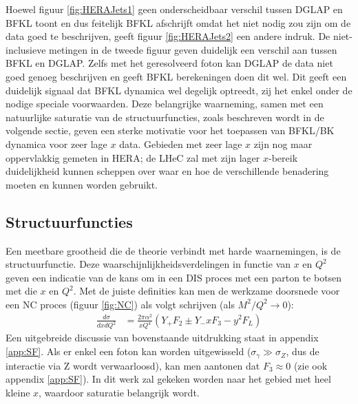 \documentclass[a4paper,11pt]{article}
\numberwithin{equation}{section} %
\begin{document}
Hoewel figuur \ref{fig:HERAJets1} geen onderscheidbaar verschil tussen DGLAP en BFKL toont en dus feitelijk BFKL afschrijft omdat het niet nodig zou zijn om de data goed te beschrijven, geeft figuur \ref{fig:HERAJets2} een andere indruk.
De niet-inclusieve metingen in de tweede figuur geven duidelijk een verschil aan tussen BFKL en DGLAP.
Zelfs met het geresolveerd foton kan DGLAP de data niet goed genoeg beschrijven en geeft BFKL berekeningen doen dit wel.
Dit geeft een duidelijk signaal dat BFKL dynamica wel degelijk optreedt, zij het enkel onder de nodige speciale voorwaarden.
Deze belangrijke waarneming, samen met een natuurlijke saturatie van de structuurfuncties, zoals beschreven wordt in de volgende sectie, geven een sterke motivatie voor het toepassen van BFKL/BK dynamica voor zeer lage $x$ data.
Gebieden met zeer lage $x$ zijn nog maar oppervlakkig gemeten in HERA; de LHeC zal met zijn lager $x$-bereik duidelijkheid kunnen scheppen over waar en hoe de verschillende benadering moeten en kunnen worden gebruikt.

    \subsection{Structuurfuncties}
Een meetbare grootheid die de theorie verbindt met harde waarnemingen, is de structuurfunctie.
Deze waarschijnlijkheidsverdelingen in functie van $x$ en $Q^2$  geven een indicatie van de kans om in een DIS proces met een parton te botsen met die $x$ en $Q^2$.
Met de juiste definities kan men de werkzame doorsnede voor een NC proces (figuur \ref{fig:NC}) als volgt schrijven (als $M^2/Q^2 \rightarrow 0$):
\begin{align} \label{eq:SF}
\frac{d\sigma}{dxdQ^2} &= \frac{2\pi \alpha^2}{xQ^4} \left(Y_+ F_2 \pm Y_- x F_3 - y^2 F_L \right)
\end{align}
Een uitgebreide discussie van bovenstaande uitdrukking staat in appendix \ref{app:SF}.
Als er enkel een foton kan worden uitgewisseld ($\sigma_\gamma \gg \sigma_Z$, dus de interactie via Z wordt verwaarloosd), kan men aantonen dat $F_3 \approx 0$ (zie ook appendix \ref{app:SF}).
In dit werk zal gekeken worden naar het gebied met heel kleine $x$, waardoor saturatie belangrijk wordt.
\end{document}
